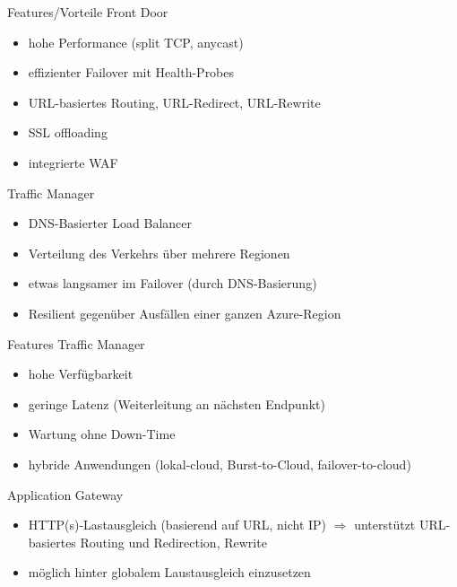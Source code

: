 \begin{flashcard}[]{Features/Vorteile Front Door}
  \begin{itemize}
    \item hohe Performance (split TCP, anycast)
    \item effizienter Failover mit Health-Probes
    \item URL-basiertes Routing, URL-Redirect, URL-Rewrite
    \item SSL offloading
    \item integrierte WAF
  \end{itemize}
\end{flashcard}

\begin{flashcard}[]{Traffic Manager}
  \begin{itemize}
    \item DNS-Basierter Load Balancer
    \item Verteilung des Verkehrs über mehrere Regionen
    \item etwas langsamer im Failover (durch DNS-Basierung)
    \item Resilient gegenüber Ausfällen einer ganzen Azure-Region
  \end{itemize}
\end{flashcard}

\begin{flashcard}[]{Features Traffic Manager}
  \begin{itemize}
    \item hohe Verfügbarkeit
    \item geringe Latenz (Weiterleitung an nächsten Endpunkt)
    \item Wartung ohne Down-Time
    \item hybride Anwendungen (lokal-cloud, Burst-to-Cloud, failover-to-cloud)
  \end{itemize}
\end{flashcard}

\begin{flashcard}[]{Application Gateway}
  \begin{itemize}
    \item HTTP(s)-Lastausgleich (basierend auf URL, nicht IP)\newline
      $\Rightarrow$ unterstützt URL-basiertes Routing und Redirection, Rewrite
    \item möglich hinter globalem Laustausgleich einzusetzen
  \end{itemize}
\end{flashcard}

